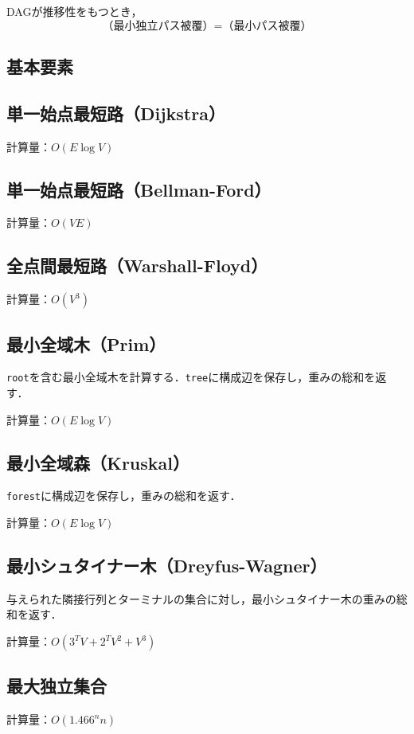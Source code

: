 \documentclass[landscape,twocolumn,9pt]{jsarticle}
\begin{document}
DAGが推移性をもつとき，
\[ \text{（最小独立パス被覆）}=\text{（最小パス被覆）} \]

\subsection{基本要素}


\subsection{単一始点最短路（Dijkstra）}
計算量：$O(E\log V)$


\subsection{単一始点最短路（Bellman-Ford）}
計算量：$O(VE)$


\subsection{全点間最短路（Warshall-Floyd）}
計算量：$O(V^3)$


\subsection{最小全域木（Prim）}
\texttt{root}を含む最小全域木を計算する．\texttt{tree}に構成辺を保存し，重みの総和を返す．

計算量：$O(E\log V)$


\subsection{最小全域森（Kruskal）}
\texttt{forest}に構成辺を保存し，重みの総和を返す．

計算量：$O(E\log V)$


\subsection{最小シュタイナー木（Dreyfus-Wagner）}
与えられた隣接行列とターミナルの集合に対し，最小シュタイナー木の重みの総和を返す．

計算量：$O(3^TV+2^TV^2+V^3)$


\subsection{最大独立集合}
計算量：$O(1.466^n n)$

\end{document}
